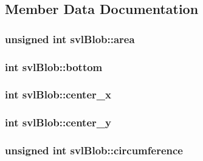 \subsection{Member Data Documentation}
\hypertarget{structsvl_blob_a7e72d5f683c384f0980f6d322630af74}{
\subsubsection[{area}]{\setlength{\rightskip}{0pt plus 5cm}unsigned int svl\-Blob\-::area}}\label{structsvl_blob_a7e72d5f683c384f0980f6d322630af74}
\hypertarget{structsvl_blob_a536219faa643cda03590b3582964cae8}{
\subsubsection[{bottom}]{\setlength{\rightskip}{0pt plus 5cm}int svl\-Blob\-::bottom}}\label{structsvl_blob_a536219faa643cda03590b3582964cae8}
\hypertarget{structsvl_blob_a13f6815c8e9adc6a23344281388a6297}{
\subsubsection[{center\-\_\-x}]{\setlength{\rightskip}{0pt plus 5cm}int svl\-Blob\-::center\-\_\-x}}\label{structsvl_blob_a13f6815c8e9adc6a23344281388a6297}
\hypertarget{structsvl_blob_a8f827cd578843e0d8456d9e95f982988}{
\subsubsection[{center\-\_\-y}]{\setlength{\rightskip}{0pt plus 5cm}int svl\-Blob\-::center\-\_\-y}}\label{structsvl_blob_a8f827cd578843e0d8456d9e95f982988}
\hypertarget{structsvl_blob_a880846887397dd387770e6244a680513}{
\subsubsection[{circumference}]{\setlength{\rightskip}{0pt plus 5cm}unsigned int svl\-Blob\-::circumference}}\label{structsvl_blob_a880846887397dd387770e6244a680513}
